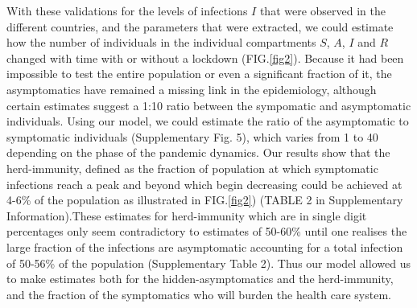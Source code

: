 \documentclass[aps,prl,reprint,superscriptaddress]{revtex4-1}
\begin{document}
  

With these validations for the levels of infections $I$ that were observed in the different countries, and the parameters that were extracted, we could estimate how the number of individuals in the individual compartments $S$, $A$, $I$ and $R$ changed with time with or without a lockdown (FIG.\ref{fig2}). Because it had been impossible to test the entire population or even a significant fraction of it, the asymptomatics have remained a missing link in the epidemiology, although certain estimates suggest a 1:10 ratio between the sympomatic and asymptomatic individuals.  Using our model, we could estimate the ratio of the asymptomatic to symptomatic individuals (Supplementary Fig. 5), which varies from 1 to 40 depending on the phase of the pandemic dynamics. Our results show that the herd-immunity, defined as the fraction of population at which symptomatic infections reach a peak and beyond which begin decreasing could be achieved at 4-6\% of the population as illustrated in FIG.\ref{fig2}) (TABLE 2 in Supplementary Information).These estimates for herd-immunity which are in single digit percentages only seem contradictory to estimates of 50-60\% \cite{randolph2020herd} until one realises the large fraction of the infections are asymptomatic accounting for a total infection of 50-56\% of the population (Supplementary Table 2). Thus our model allowed us to make estimates both for the hidden-asymptomatics and the herd-immunity, and the fraction of the symptomatics who will burden the health care system. 
\end{document}
